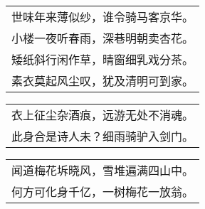 \nopagebreak%
\nopagebreak%
\noindent\begin{minipage}{\linewidth}
  \vskip-3pt\begin{table}[H]
    \centering
    \begin{tabular}{@{}l@{}}
世味年来薄似纱，谁令骑马客京华。\\
小楼一夜听春雨，深巷明朝卖杏花。\\
矮纸斜行闲作草，晴窗细乳戏分茶。\\
素衣莫起风尘叹，犹及清明可到家。
    \end{tabular}
  \end{table}
\end{minipage}
\vspace{1cm}


\nopagebreak%
\nopagebreak%
\noindent\begin{minipage}{\linewidth}
  \vskip-3pt\begin{table}[H]
    \centering
    \begin{tabular}{@{}l@{}}
衣上征尘杂酒痕，远游无处不消魂。\\
此身合是诗人未？细雨骑驴入剑门。
    \end{tabular}
  \end{table}
\end{minipage}
\vspace{1cm}


\nopagebreak%
\nopagebreak%
\noindent\begin{minipage}{\linewidth}
  \vskip-3pt\begin{table}[H]
    \centering
    \begin{tabular}{@{}l@{}}
闻道梅花坼晓风，雪堆遍满四山中。\\
何方可化身千亿，一树梅花一放翁。
    \end{tabular}
  \end{table}
\end{minipage}
\vspace{1cm}


